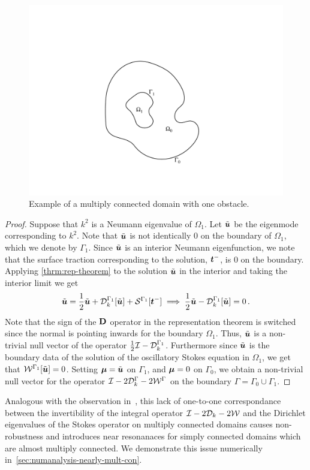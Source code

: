 \begin{figure}
\begin{center}
\includegraphics[width=0.3\linewidth]{media/multiply_final}
\end{center}
\caption{Example of a multiply connected domain with one obstacle.}
\label{fig:1ply}
\end{figure}

\begin{proof}
  Suppose that $k^2$ is a Neumann eigenvalue of $\Omega_{1}$.
  Let $\tilde{{\boldsymbol u}}$ be the eigenmode corresponding to $k^2$. 
  Note that $\tilde{{\boldsymbol u}}$ is not identically $0$ on the boundary
  of $\Omega_{1}$, which we denote by $\Gamma_1$.
  Since $\tilde{{\boldsymbol u}}$ is an interior Neumann eigenfunction, we note that
  the surface traction corresponding to the solution, ${\boldsymbol t}^{-}$, is $0$
  on the boundary.
  Applying \cref{thrm:rep-theorem} to the
  solution $\tilde{{\boldsymbol u}}$ in the interior
  and taking the interior limit we get
\begin{equation}
\tilde{{\boldsymbol u}} = \frac{1}{2}\tilde{{\boldsymbol u}} + {\mathcal D}^{\Gamma_{1}}_{k}[\tilde{{\boldsymbol u}}] +
{\mathcal S}^{\Gamma_{1}} [{\boldsymbol t}^{-}] \implies \frac{1}{2} \tilde{{\boldsymbol u}} - {\mathcal D}^{\Gamma_{1}}_{k}[\tilde{{\boldsymbol u}}]
= 0\, .
\end{equation}
Note that the sign of the ${\bf D}$ operator in the
representation theorem is switched since the normal
is pointing inwards for the boundary $\Omega_{1}$.
Thus, $\tilde{{\boldsymbol u}}$ is a non-trivial null vector of the operator 
$\frac{1}{2}\mathcal I - {\mathcal D}^{\Gamma_{1}}_{k}$. 
Furthermore since $\tilde{{\boldsymbol u}}$ is the boundary data of 
the solution of the oscillatory Stokes equation
in $\Omega_{1}$, we get that ${\mathcal W}^{\Gamma_{1}}[\tilde{{\boldsymbol u}}] = 0$.
Setting ${\boldsymbol \mu} = \tilde{{\boldsymbol u}}$ on $\Gamma_{1}$, and
${\boldsymbol \mu} = 0$ on $\Gamma_{0}$, we obtain a non-trivial null
vector for the operator $\mathcal I - 2{\mathcal D}^{\Gamma}_{k} -2{\mathcal W}^{\Gamma}$
on the boundary $\Gamma = \Gamma_{0} \cup \Gamma_{1}$.
\end{proof}

Analogous with the observation in~\cite{zhao2015robust},
this lack of one-to-one correspondance between
the invertibility of the integral operator $\mathcal I - 2{\mathcal D}_{k} - 2{\mathcal W}$
and the Dirichlet eigenvalues of the Stokes operator on multiply
connected domains causes non-robustness and introduces near 
resonanaces for simply connected domains
which are almost multiply connected.
We demonstrate this issue numerically
in~\cref{sec:numanalysis-nearly-mult-con}.


